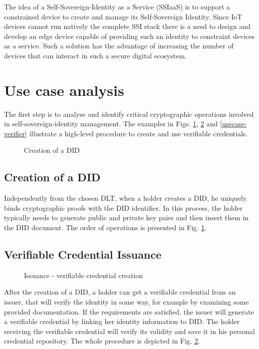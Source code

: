 
The idea of a Self-Sovereign-Identity as a Service (SSIaaS) is to support a constrained device to create and manage its Self-Sovereign Identity. Since IoT devices cannot run natively the complete SSI stack there is a need to design and develop an edge device capable of providing such an identity to constraint devices as a service.  Such a solution has the advantage of increasing the number of devices that can interact in such a secure digital ecosystem.

\section{Use case analysis}
The first step is to analyse and identify critical cryptographic operations involved in self-sovereign-identity management. The examples in Figs. \ref{usecase-did}, \ref{usecase-issuer} and \ref{usecase-verifier} illustrate a high-level procedure to create and use verifiable credentials. 
\begin{figure}[!h]
    \centering
    
    \caption{Creation of a DID}
    \label{usecase-did}
\end{figure}

\subsection{Creation of a DID}
Independently from the chosen DLT, when a holder creates a DID, he uniquely binds cryptographic proofs with the DID identifier. In this process, the holder typically needs to generate public and private key pairs and then insert them in the DID document. The order of operations is presented in Fig. \ref{usecase-did}. 
\subsection{Verifiable Credential Issuance}
\begin{figure}[!h]
    \centering
    
    \caption{Issuance - verifiable credential creation}
    \label{usecase-issuer}
\end{figure}
After the creation of a DID, a holder can get a verifiable credential from an issuer, that will verify the identity in some way, for example by examining some provided documentation. If the requirements are satisfied, the issuer will generate a verifiable credential by linking her identity information to DID. The holder receiving the verifiable credential will verify its validity and save it in his personal credential repository. The whole procedure is depicted in Fig. \ref{usecase-issuer}. 
